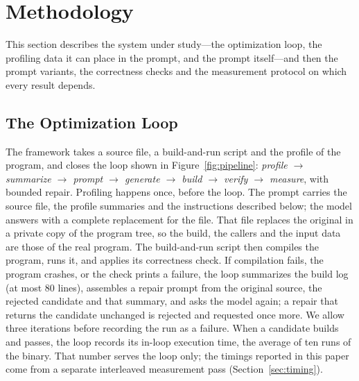 \section{Methodology}
\label{sec:method}
This section describes the system under study---the optimization loop, the profiling data it can
place in the prompt, and the prompt itself---and then the prompt variants, the correctness checks and
the measurement protocol on which every result depends.

\subsection{The Optimization Loop}
\label{sec:subject}
The framework takes a source file, a build-and-run script and the profile of the program, and closes
the loop shown in Figure~\ref{fig:pipeline}: \emph{profile $\rightarrow$ summarize $\rightarrow$ prompt
$\rightarrow$ generate $\rightarrow$ build $\rightarrow$ verify $\rightarrow$ measure}, with bounded
repair. Profiling happens once, before the loop. The prompt carries the source file, the profile
summaries and the instructions described below; the model answers with a complete replacement for the
file. That file replaces the original in a private copy of the program tree, so the build, the callers
and the input data are those of the real program. The build-and-run script then compiles the program,
runs it, and applies its correctness check. If compilation fails, the program crashes, or the check
prints a failure, the loop summarizes the build log (at most $80$ lines), assembles a repair prompt
from the original source, the rejected candidate and that summary, and asks the model again; a repair
that returns the candidate unchanged is rejected and requested once more. We allow three iterations
before recording the run as a failure. When a candidate builds and passes, the loop records its
in-loop execution time, the average of ten runs of the binary. That number serves the loop only; the
timings reported in this paper come from a separate interleaved measurement pass
(Section~\ref{sec:timing}).

